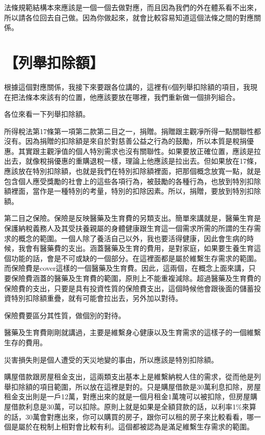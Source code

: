\documentclass[]{ctexbook}
\begin{document}
法條規範結構本來應該是一個一個去做對應，而且因為我們的外在體系看不出來，所以請各位回去自己做。因為你做起來，就會比較容易知道這個法條之間的對應關係。

\hypertarget{ux5217ux8209ux6263ux9664ux984d}{%
\section{【列舉扣除額】}\label{ux5217ux8209ux6263ux9664ux984d}}

根據這個對應關係，我接下來要跟各位講的，這裡有6個列舉扣除額的項目，我現在把法條本來該有的位置，他應該要放在哪裡，我們重新做一個排列組合。

各位來看一下列舉扣除額。

所得稅法第17條第一項第二款第二目之一，捐贈。捐贈跟主觀凈所得一點關聯性都沒有。因為捐贈的扣除額是來自於對慈善公益之行為的鼓勵，所以本質是稅捐優惠。其實跟主觀淨值的個人特別需求也沒有關聯性。如果要放正確位置，應該是拉出去，就像稅捐優惠的重購退稅一樣，理論上他應該是拉出去。但如果放在17條，應該放在特別扣除額，也就是我們在特別扣除額裡面，把那個概念放寬一點，就是包含個人應受獎勵的社會上的這些各項行為，被鼓勵的各種行為，也放到特別扣除額裡面，當作是一種特別的考量，特別的扣除因素。所以，捐贈，要放到特別扣除額。

第二目之保險。保險是反映醫藥及生育費的另類支出。簡單來講就是，醫藥生育是保護納稅義務人及其受扶養親屬的身體健康跟生育這一個需求所需的所謂的生存需求的概念的範圍。一個人除了養活自己以外，我也要活得健康，因此會生病的時候，我會有醫藥費的支出。涵蓋醫藥及生育的費用，是對家庭，如果要生養生育這個功能的話，會是不可或缺的一個部分。在這裡面都是屬於維繫生存需求的範圍。而保險費是cover這樣的一個醫藥及生育費。因此，這兩個，在概念上面來講，只要保險費涵蓋的醫藥及生育費的範圍，原則上不能重複減除。超過醫藥及生育費的保險費的支出，只要是具有投資性質的保險費支出，這個時候他會跟後面的儲蓄投資特別扣除額重疊，就有可能會拉出去，另外加以對待。

保險費要區分其性質，做個別的對待。

醫藥及生育費剛剛就講過，主要是維繫身心健康以及生育需求的這樣子的一個維繫生存的費用。

災害損失則是個人遭受的天災地變的事由，所以應該是特別扣除額。

購屋借款跟房屋租金支出，這兩類支出基本上是維繫納稅人住的需求，從而他是列舉扣除額的項目範圍，所以放在這裡是對的。只是購屋借款是30萬利息扣除，房屋租金支出則是一戶12萬，對應出來的就是一個月租金1萬塊可以被扣除，但房屋購屋借款利息是30萬，可以扣除。原則上就是如果是全額貸款的話，以利率1\%來算的話，30萬會對應出來，你可以購買的房子，跟你可以租的房子來比較看看，哪一個是屬於在稅制上相對會比較有利。這個都被認為是滿足維繫生存需求的範圍。
\end{document}
